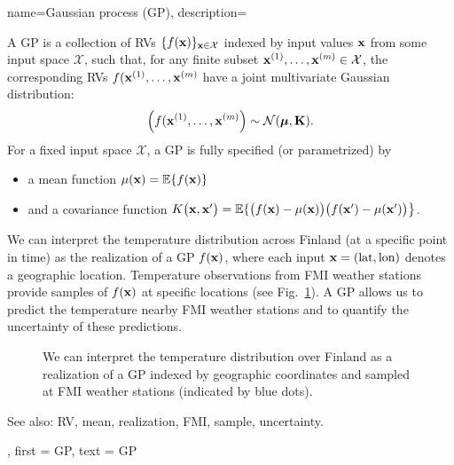 {name={Gaussian process (GP)},
  description={A GP is a collection of RVs 
  	$\{f({\bf x})\}_{{\bf x} \in \mathcal{X}}$ indexed by input values ${\bf x}$ 
  	from some input space $\mathcal{X}$, such that, for any finite subset 
  	${\bf x}^{(1)}, \ldots, {\bf x}^{(m)} \in \mathcal{X}$, 
  	the corresponding RVs $f({\bf x}^{(1)}, \ldots, {\bf x}^{(m)}$ have a joint 
  	multivariate Gaussian distribution:
  	\[
  	\left( f({\bf x}^{(1)}, \ldots, {\bf x}^{(m)} \right) \sim \mathcal{N}(\boldsymbol{\mu}, \mathbf{K}).
  	\]
  	For a fixed input space $\mathcal{X}$, a GP is fully specified (or parametrized) by 
  	\begin{itemize}
  		\item a mean function $\mu({\bf x}) = \mathbb{E} \{ f({\bf x})\}$
  		\item and a covariance function $K\big({\bf x},{\bf x}'\big)= \mathbb{E} \{ \big(f({\bf x})-\mu({\bf x})\big) \big(f({\bf x}')-\mu({\bf x}')\big) \big\}$.
  	\end{itemize}
  	 We can interpret the temperature distribution across Finland (at a specific 
  	point in time) as the realization of a GP $f({\bf x})$, where each input ${\bf x} = (\text{lat}, \text{lon})$ 
  	denotes a geographic location. Temperature observations from FMI weather stations provide 
  	samples of $f({\bf x})$ at specific locations (see Fig.\ \ref{fig_gp_FMI}). A GP allows us to 
  	predict the temperature nearby FMI weather stations and to quantify the uncertainty 
  	of these predictions. 
  	\begin{figure}[H]
  	\begin{center}
\vspace*{-15mm}
\end{center}
\caption{We can interpret the temperature distribution over Finland as a realization 
	of a GP indexed by geographic coordinates and sampled at FMI weather stations (indicated by 
	blue dots). \label{fig_gp_FMI}}
\end{figure}
See also: RV, mean, realization, FMI, sample, uncertainty.}, 
first = {GP}, 
text = {GP}
}


